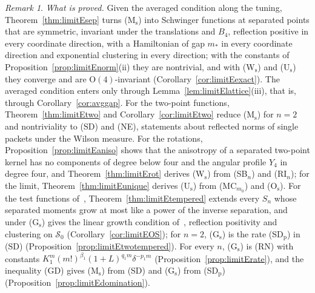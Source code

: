 \documentclass[aps,prd,twocolumn,superscriptaddress,nofootinbib,longbibliography,floatfix,amsmath,amssymb,10pt]{revtex4-2}
\theoremstyle{definition}
\theoremstyle{remark}
\newtheorem{remark}[theorem]{Remark}
\begin{document}
\begin{remark}\label{rem:limitEscope}
\emph{What is proved.} Given the averaged condition along the tuning,
Theorem~\ref{thm:limitEsep} turns (M$_{\mathrm s}$) into Schwinger
functions at separated points that are symmetric, invariant under the
translations and $B_4$, reflection positive in every coordinate direction,
with a Hamiltonian of gap $m_*$ in every coordinate direction and
exponential clustering in every direction; with the constants of
Proposition~\ref{prop:limitEnorm}(ii) they are nontrivial, and with
(W$_{\mathrm s}$) and (U$_{\mathrm s}$) they converge and are
$\mathrm O(4)$-invariant (Corollary~\ref{cor:limitEexact}). The averaged
condition enters only through Lemma~\ref{lem:limitElattice}(iii), that is,
through Corollary~\ref{cor:avggap}. For the two-point functions,
Theorem~\ref{thm:limitEtwo} and Corollary~\ref{cor:limitEtwo} reduce
(M$_{\mathrm s}$) for $n=2$ and nontriviality to (SD) and (NE), statements about
reflected norms of single packets under the Wilson measure. For the
rotations, Proposition~\ref{prop:limitEaniso} shows that the anisotropy of a
separated two-point kernel has no components of degree below four and the
angular profile $Y_4$ in degree four, and Theorem~\ref{thm:limitErot}
derives (W$_{\mathrm s}$) from (SB$_n$) and (RI$_n$); for the limit,
Theorem~\ref{thm:limitEunique} derives (U$_{\mathrm s}$) from
(MC$_{m_0}$) and (O$_{\mathrm s}$). For the test functions of~\cite{OS73},
Theorem~\ref{thm:limitEtempered} extends every $S_n$ whose separated moments
grow at most like a power of the inverse separation, and under
(G$_{\mathrm s}$) gives the linear growth condition of~\cite{OS75},
reflection positivity and clustering on $\mathcal S_0$
(Corollary~\ref{cor:limitEOS}); for $n=2$, (G$_{\mathrm s}$) is the rate
(SD$_{\mathrm p}$) in (SD) (Proposition~\ref{prop:limitEtwotempered}). For
every $n$, (G$_{\mathrm s}$) is (RN) with constants
$K_1^m(m!)^{\beta_1}(1+L)^{q_1m}\delta^{-p_1m}$
(Proposition~\ref{prop:limitErate}), and the inequality (GD) gives
(M$_{\mathrm s}$) from (SD) and (G$_{\mathrm s}$) from (SD$_{\mathrm p}$)
(Proposition~\ref{prop:limitEdomination}).


\end{remark}
\end{document}
